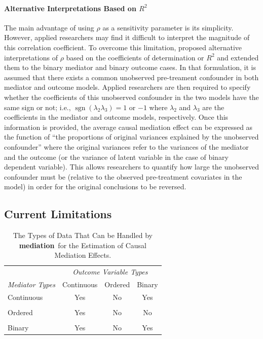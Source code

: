 \documentclass[11pt,letterpaper]{article}
\theoremstyle{plain}
\DeclareMathOperator{\sgn}{sgn}
\newcommand\bmediation{{\bf mediation}}
\begin{document}
\paragraph{Alternative Interpretations Based on $R^2$}

The main advantage of using $\rho$ as a sensitivity parameter is its
simplicity.  However, applied researchers may find it difficult to
interpret the magnitude of this correlation coefficient.  To overcome
this limitation, \citet{imai:keel:yama:10} proposed alternative
interpretations of $\rho$ based on the coefficients of determination
or $R^2$ and \citet{imai:keel:ting:10} extended them to the binary
mediator and binary outcome cases.  In that formulation, it is assumed
that there exists a common unobserved pre-treament confounder in both
mediator and outcome models.  Applied researchers are then required to
specify whether the coefficients of this unobserved confounder in the
two models have the same sign or not; i.e.,
$\sgn(\lambda_2\lambda_3)=1$ or $-1$ where $\lambda_2$ and $\lambda_3$
are the coefficients in the mediator and outcome models, respectively.
Once this information is provided, the average causal mediation effect
can be expressed as the function of ``the proportions of original
variances explained by the unobserved confounder'' where the original
variances refer to the variances of the mediator and the outcome (or
the variance of latent variable in the case of binary dependent
variable).  This allows researchers to quantify how large the
unobserved confounder must be (relative to the observed pre-treatment
covariates in the model) in order for the original conclusions to be
reversed.


\subsection{Current Limitations}

\begin{table}[t]
  \begin{center}
\begin{tabular}{lccc}
\hline
                     &\multicolumn{3}{c}{\it Outcome Variable Types} \\
\cline{2-4}
{\it Mediator Types} & Continuous    & Ordered & Binary \\ 
\hline
Continuous           & Yes           & No      & Yes \\
                     &               &         &  \\
Ordered              &  Yes          & No      &  No  \\
                     &               &         &  \\
Binary               &  Yes          & No      & Yes \\
\hline
\end{tabular}
\caption{The Types of Data That Can be Handled by \bmediation\ for the
  Estimation of Causal Mediation Effects.} \label{tab:MediateOptions}
  \end{center}
\end{table}
\end{document}
